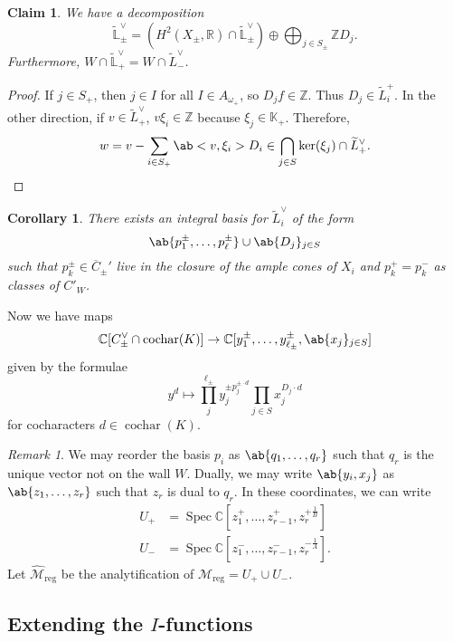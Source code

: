 \documentclass[leqno, openany]{memoir}
\newtheorem{cor}[thm]{Corollary}
\newtheorem{claim}[thm]{Claim}
\theoremstyle{definition}
\theoremstyle{remark}
\newtheorem{rmk}[thm]{Remark}
\theoremstyle{plain}
\theoremstyle{definition}
\theoremstyle{remark}
\newcommand{\R}{\mathbb{R}}
\newcommand{\C}{\mathbb{C}}
\newcommand{\Z}{\mathbb{Z}}
\newcommand{\K}{\mathbb{K}}
\renewcommand{\L}{\mathbb{L}}
\newcommand{\mc}[1]{\mathcal{#1}}
\newcommand{\mr}[1]{\mathrm{#1}}
\newcommand{\on}[1]{\operatorname{#1}}
\newcommand{\ol}[1]{\overline{#1}}
\newcommand{\wt}[1]{\widetilde{#1}}
\newcommand{\wh}[1]{\widehat{#1}}
\DeclareMathOperator{\Spec}{Spec}
\begin{document}
\begin{claim}
    We have a decomposition
    \[ \wt{\L}_{\pm}^{\vee} = (H^2(X_{\pm}, \R) \cap \wt{\L}_{\pm}^{\vee}) \oplus\bigoplus_{j \in S_{\pm}} \Z D_j. \]
    Furthermore, $W \cap \wt{\L}_+^{\vee} = W \cap \wt{L}_-^{\vee}$.
\end{claim}

\begin{proof}
    If $j \in S_+$, then $j \in I$ for all $I \in A_{\omega_+}$, so $D_j f \in \Z$. Thus $D_j \in \wt{L}_i^{+}$. In the other direction, if $v \in \wt{L}_+^{\vee}$, $v \xi_i \in \Z$ because $\xi_j \in \K_+$. Therefore,
    \[ w = v - \sum_{i \in S_+} \ab<v,\xi_i> D_i \in \bigcap_{j \in S}\ker(\xi_j) \cap \wt{L}_+^{\vee}. \qedhere \]
\end{proof}

\begin{cor}
    There exists an integral basis for $\wt{L}_i^{\vee}$ of the form
    \[ \ab\{ p_1^{\pm}, \ldots, p_{\ell}^{\pm}\} \cup \ab\{D_j\}_{j \in S} \]
    such that $p_k^{\pm} \in \ol{C}_{\pm}'$ live in the closure of the ample cones of $X_i$ and $p_k^+ = p_k^-$ as classes of $C'_W$.
\end{cor}

Now we have maps
\[ \C[C_{\pm}^{\vee} \cap \on{cochar}(K)] \to \C[y_1^{\pm}, \ldots, y_{\ell_{\pm}}^{\pm}, \ab\{x_j\}_{j \in S}] \]
given by the formulae
\[ y^d \mapsto \prod_{j}^{\ell_{\pm}} y_j^{\pm p_j^{\pm \cdot d}} \prod_{j\in S} x_j^{D_j \cdot d} \]
for cocharacters $d \in \on{cochar}(K)$.

\begin{rmk}
    We may reorder the basis $p_i$ as $\ab\{q_1, \ldots, q_r\}$ such that $q_r$ is the unique vector not on the wall $W$. Dually, we may write $\ab\{y_i, x_j\}$ as $\ab\{z_1, \ldots, z_r\}$ such that $z_r$ is dual to $q_r$. In these coordinates, we can write
    \begin{align*}
        U_+ &= \Spec \C[z_1^+, \ldots, z_{r-1}^+, z_r^{+ \frac{1}{B}}] \\
        U_- &= \Spec \C[z_1^-, \ldots, z_{r-1}^-, z_r^{- \frac{1}{A}}] .
    \end{align*}
    Let $\wh{\mc{M}}_{\mr{reg}}$ be the analytification of $\mc{M}_{\mr{reg}} = U_+ \cup U_-$.
\end{rmk}

\subsection{Extending the $I$-functions}%
\label{sub:Extending the I-functions}
\end{document}

